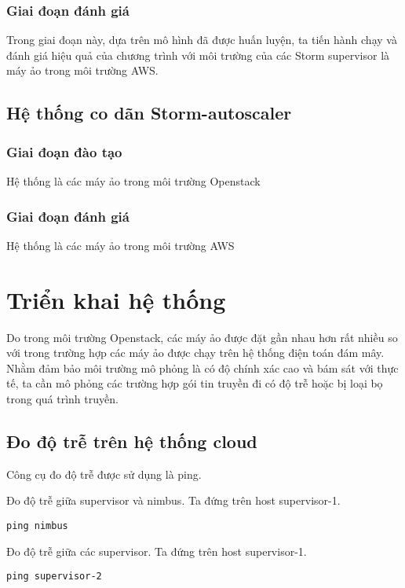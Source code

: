 \subsubsection{Giai đoạn đánh giá}
Trong giai đoạn này, dựa trên mô hình đã được huấn luyện, ta tiến hành chạy và đánh giá hiệu quả của chương trình với môi trường của các Storm supervisor là máy ảo trong môi trường AWS.

\subsection{Hệ thống co dãn Storm-autoscaler}

\subsubsection{Giai đoạn đào tạo}
Hệ thống là các máy ảo trong môi trường Openstack

\subsubsection{Giai đoạn đánh giá}
Hệ thống là các máy ảo trong môi trường AWS

\section{Triển khai hệ thống}
Do trong môi trường Openstack, các máy ảo được đặt gần nhau hơn rất nhiều so với trong trường hợp các máy ảo được chạy trên hệ thống điện toán đám mây.
Nhằm đảm bảo môi trường mô phỏng là có độ chính xác cao và bám sát với thực tế, ta cần mô phỏng các trường hợp gói tin truyền đi có độ trễ hoặc bị loại bọ trong quá trình truyền.

\subsection{Đo độ trễ trên hệ thống cloud}

Công cụ đo độ trễ được sử dụng là ping\autocite{enwiki:1281794342}.

Đo độ trễ giữa supervisor và nimbus. Ta đứng trên host supervisor-1.
\begin{lstlisting}
ping nimbus
\end{lstlisting}

Đo độ trễ giữa các supervisor. Ta đứng trên host supervisor-1.
\begin{lstlisting}
ping supervisor-2
\end{lstlisting}

